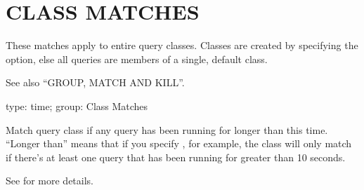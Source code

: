 \documentclass[letterpaper,10pt,english]{sphinxmanual}
\begin{document}
\section{CLASS MATCHES}
\label{\detokenize{mariadb-kill:class-matches}}
\sphinxAtStartPar
These matches apply to entire query classes.  Classes are created by specifying
the {\hyperref[\detokenize{mariadb-kill:cmdoption-mariadb-kill-group-by}]{}} option, else all queries are members of a single, default
class.

\sphinxAtStartPar
See also “GROUP, MATCH AND KILL”.

\begin{fulllineitems}
\label{\detokenize{mariadb-kill:cmdoption-mariadb-kill-any-busy-time}}
\sphinxAtStartPar
type: time; group: Class Matches

\sphinxAtStartPar
Match query class if any query has been running for longer than this time.
“Longer than” means that if you specify , for example, the class will
only match if there’s at least one query that has been running for greater
than 10 seconds.

\sphinxAtStartPar
See {\hyperref[\detokenize{mariadb-kill:cmdoption-mariadb-kill-each-busy-time}]{}} for more details.

\end{fulllineitems}

\end{document}
